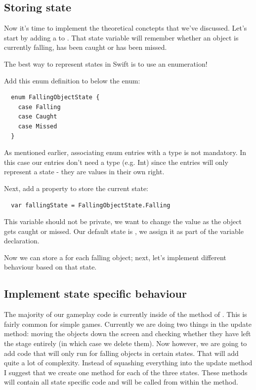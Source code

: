 \subsection{Storing state}
Now it's time to implement the theoretical conctepts that we've discussed. 
Let's start by adding a  to
. That state variable will remember whether an object is currently falling, has been caught
or has been missed.

The best way to represent states in Swift is to use an enumeration!
\begin{leftbar}
Add this enum definition to  below the
 enum:
\begin{lstlisting}
  enum FallingObjectState {
    case Falling
    case Caught
    case Missed
  }
\end{lstlisting}
\end{leftbar}
As mentioned earlier, associating enum entries with a type is not
mandatory. In this case our entries don't need a type (e.g. Int) since the
entries will only represent a state - they are values in their own right.

\begin{leftbar}
Next, add a property to store the current state:
\begin{lstlisting}
  var fallingState = FallingObjectState.Falling
\end{lstlisting}
\end{leftbar}
This variable should not be private, we want to change the value as
the object gets caught or missed. Our default state is , we
assign it as part of the variable declaration.

Now we can store a  for each falling object; next,
let's implement different behaviour based on that state.

\subsection{Implement state specific behaviour}
The majority of our gameplay code is currently inside of the 
method of . This is fairly common for simple games.
Currently we are doing two things in the update method: moving the objects down
the screen and checking whether they have left the stage entirely (in which
case we delete them). Now however, we are going to add code that will only run
for falling objects in certain states. That will add quite a lot of complexity.
Instead of squashing everything into the update method I suggest that we
create one method for each of the three states. These methods will contain
all state specific code and will be called from within the 
method.

